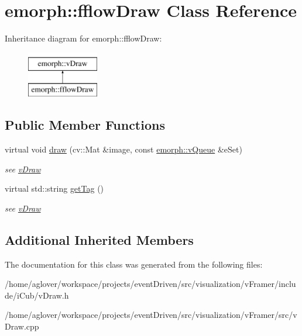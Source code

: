 \hypertarget{classemorph_1_1fflowDraw}{\section{emorph\-:\-:fflow\-Draw Class Reference}
\label{classemorph_1_1fflowDraw}
}
Inheritance diagram for emorph\-:\-:fflow\-Draw\-:\begin{figure}[H]
\begin{center}
\leavevmode
\includegraphics[height=2.000000cm]{classemorph_1_1fflowDraw}
\end{center}
\end{figure}
\subsection*{Public Member Functions}
\begin{DoxyCompactItemize}
\item 
\hypertarget{classemorph_1_1fflowDraw_ae2214e69d31fb9fdcab0e5ba9c8b6f99}{virtual void \hyperlink{classemorph_1_1fflowDraw_ae2214e69d31fb9fdcab0e5ba9c8b6f99}{draw} (cv\-::\-Mat \&image, const \hyperlink{classemorph_1_1vQueue}{emorph\-::v\-Queue} \&e\-Set)}\label{classemorph_1_1fflowDraw_ae2214e69d31fb9fdcab0e5ba9c8b6f99}

\begin{DoxyCompactList}\small\item\em see \hyperlink{classemorph_1_1vDraw}{v\-Draw} \end{DoxyCompactList}\item 
\hypertarget{classemorph_1_1fflowDraw_a742dbd851c4c3a9aca679505571f951d}{virtual std\-::string \hyperlink{classemorph_1_1fflowDraw_a742dbd851c4c3a9aca679505571f951d}{get\-Tag} ()}\label{classemorph_1_1fflowDraw_a742dbd851c4c3a9aca679505571f951d}

\begin{DoxyCompactList}\small\item\em see \hyperlink{classemorph_1_1vDraw}{v\-Draw} \end{DoxyCompactList}\end{DoxyCompactItemize}
\subsection*{Additional Inherited Members}


The documentation for this class was generated from the following files\-:\begin{DoxyCompactItemize}
\item 
/home/aglover/workspace/projects/event\-Driven/src/visualization/v\-Framer/include/i\-Cub/v\-Draw.\-h\item 
/home/aglover/workspace/projects/event\-Driven/src/visualization/v\-Framer/src/v\-Draw.\-cpp\end{DoxyCompactItemize}
